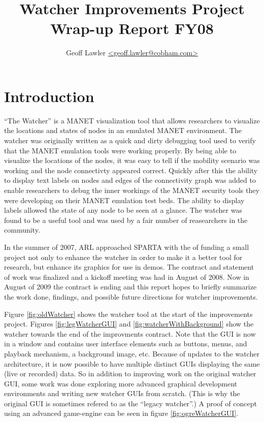 \documentclass{report}
\author{Geoff Lawler \url{<geoff.lawler@cobham.com>}}
\title{{\bf Watcher Improvements Project}\\Wrap-up Report FY08}
\begin{document}
\maketitle

\renewcommand*\thesection{\arabic{section}}

\section{Introduction}

``The Watcher'' is a MANET visualization tool that allows researchers to visualize the locations and states of nodes in an emulated MANET environment. The watcher was originally written 
as a quick and dirty debugging tool used to verify that the MANET emulation tools were working properly. By being able to visualize the locations of the nodes, it was easy to 
tell if the mobility scenario was working and the node connectivty appeared correct. Quickly after this the ability to display text labels on nodes and edges of the connectivity 
graph was added to enable researchers to debug the inner workings of the MANET security tools they were developing on their MANET emulation test beds. The ability to display labels
allowed the state of any node to be seen at a glance. The watcher was found to be a useful tool and was used by a fair number of reasearchers in the community. 

In the summer of 2007, ARL approached SPARTA with the of funding a small project not only to enhance the watcher in order to make it a better tool for research, but enhance 
its graphics for use in demos. The contract and statement of work was finalized and a kickoff meeting was had in August of 2008. Now in August of 2009 the contract is ending and 
this report hopes to briefly summarize the work done, findings, and possible future directions for watcher improvements. 

Figure \ref{fig:oldWatcher} shows the watcher tool at the start of the improvements project. Figures \ref{fig:legWatcherGUI} and \ref{fig:watcherWithBackground}
show the watcher towards the end of the improvments contract. Note that the GUI is now in a window and contains user interface elements such as buttons, menus, and playback
mechanism, a background image,  etc. Because of updates to the watcher architecture, it is now possible to have multiple distinct GUIs displaying the same (live or recorded) data. So in addition to improving
work on the original watcher GUI, some work was done exploring more advanced graphical development environments and writing new watcher GUIs from scratch. (This is why the original
GUI is sometimes refered to as the ``legacy watcher''.) A proof of concept using an advanced game-engine can be seen in figure \ref{fig:ogreWatcherGUI}. 
\end{document}

